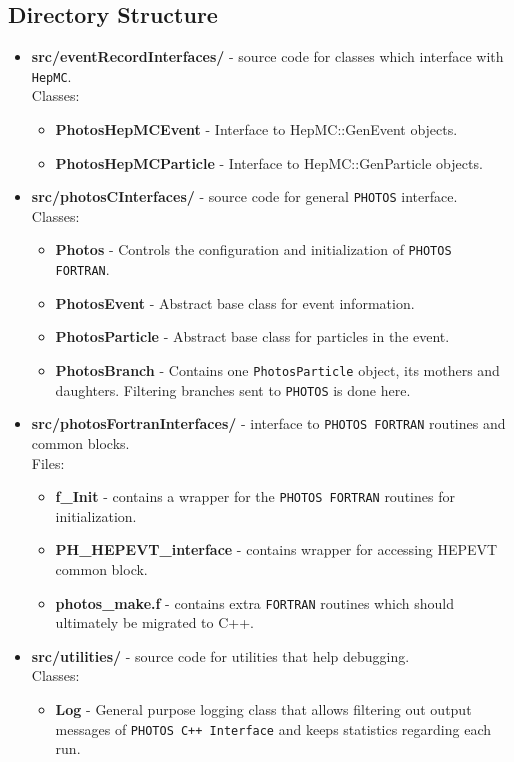 \documentclass[]{Photos_interface_design}
\begin{document}
\subsection{Directory Structure}

\begin{itemize}
\item {\bf src/eventRecordInterfaces/ } - source code for classes which interface with {\tt HepMC}.\\
  Classes:
  \begin{itemize}S
  \item { \bf PhotosHepMCEvent} - Interface to HepMC::GenEvent objects. 
  \item { \bf PhotosHepMCParticle} - Interface to HepMC::GenParticle objects. 
  \end{itemize}   

\item {\bf src/photosCInterfaces/ } - source code for general {\tt PHOTOS} interface.  \\
  Classes:
  \begin{itemize}
  \item { \bf Photos } - Controls the configuration and initialization of {\tt PHOTOS FORTRAN}.
  \item { \bf PhotosEvent } - Abstract base class for event information.
  \item { \bf PhotosParticle } - Abstract base class for particles in the event.
  \item { \bf PhotosBranch } - Contains one {\tt PhotosParticle} object, its mothers and daughters.
  Filtering branches sent to {\tt PHOTOS} is done here.
  \end{itemize}

\item {\bf src/photosFortranInterfaces/ } -  interface to {\tt PHOTOS FORTRAN} routines and common blocks. \\
  Files:
    \begin{itemize}
    \item { \bf f\_Init } - contains a wrapper for the {\tt PHOTOS FORTRAN} routines for initialization.
    \item { \bf PH\_HEPEVT\_interface } - contains wrapper for accessing HEPEVT common block.
    \item { \bf photos\_make.f } - contains extra {\tt FORTRAN} routines which should ultimately be migrated to C++.
    \end{itemize}

\item {\bf src/utilities/ } - source code for utilities that help debugging.\\
  Classes:
  \begin{itemize}
  \item { \bf Log} - General purpose logging class that allows filtering out output messages 
      of {\tt PHOTOS C++ Interface} and keeps statistics regarding each run.
  \end{itemize}   


\end{itemize}
\end{document}
